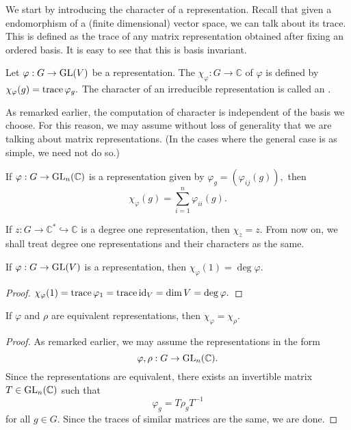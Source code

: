 We start by introducing the character of a representation. Recall that given a endomorphism of a (finite dimensional) vector space, we can talk about its trace. This is defined as the trace of any matrix representation obtained after fixing an ordered basis. It is easy to see that this is basis invariant.

\begin{defn}%
	Let $\varphi : G \to \operatorname{GL}(V)$ be a representation. The  $\chi_\varphi : G \to \mathbb{C}$ of $\varphi$ is defined by $\chi_\varphi(g) = \operatorname{trace} \varphi_g.$ The character of an irreducible representation is called an .
\end{defn}

As remarked earlier, the computation of character is independent of the basis we choose. For this reason, we may assume without loss of generality that we are talking about matrix representations. (In the cases where the general case is as simple, we need not do so.)

If $\varphi : G \to \operatorname{GL}_n(\mathbb{C})$ is a representation given by $\varphi_g = (\varphi_{ij}(g)),$ then
\begin{equation*} 
	\chi_\varphi(g) = \sum_{i = 1}^{n}\varphi_{ii}(g).
\end{equation*}

\begin{rem}
	If $z : G \to \mathbb{C}^* \hookrightarrow \mathbb{C}$ is a degree one representation, then $\chi_z = z.$ From now on, we shall treat degree one representations and their characters as the same.
\end{rem}

\begin{prop} \label{prop:charatidisdeg}
	If $\varphi : G \to \operatorname{GL}(V)$ is a representation, then $\chi_\varphi(1) = \deg \varphi.$
\end{prop}
\begin{proof} 
	$\chi_\varphi(1) = \operatorname{trace} \varphi_1 = \operatorname{trace} \operatorname{id}_V = \dim V = \deg \varphi.$
\end{proof}

\begin{prop} \label{prop:equivrepssamechar}
	If $\varphi$ and $\rho$ are equivalent representations, then $\chi_\varphi = \chi_\rho.$
\end{prop}
\begin{proof} 
	As remarked earlier, we may assume the representations in the form
	\begin{equation*} 
		\varphi, \rho : G \to \operatorname{GL}_n(\mathbb{C}).
	\end{equation*}
	Since the representations are equivalent, there exists an invertible matrix $T \in \operatorname{GL}_n(\mathbb{C})$ such that
	\begin{equation*} 
		\varphi_g = T\rho_gT^{-1}
	\end{equation*}
	for all $g \in G.$ Since the traces of similar matrices are the same, we are done.
\end{proof}

